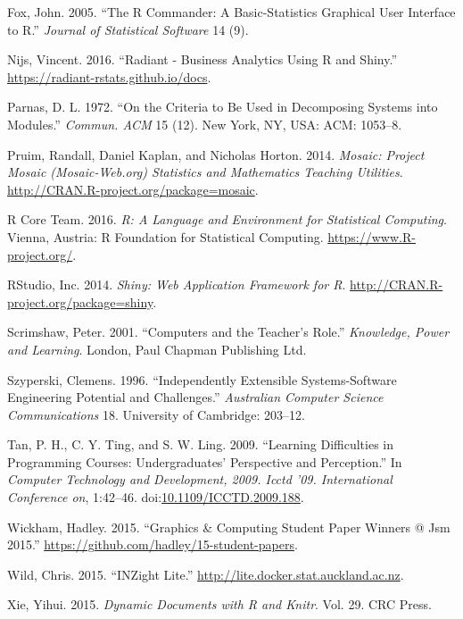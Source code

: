 \documentclass[12pt,]{article}
\begin{document}
\hypertarget{ref-fox2005}{}
Fox, John. 2005. ``The R Commander: A Basic-Statistics Graphical User
Interface to R.'' \emph{Journal of Statistical Software} 14 (9).

\hypertarget{ref-radiant}{}
Nijs, Vincent. 2016. ``Radiant - Business Analytics Using R and Shiny.''
\url{https://radiant-rstats.github.io/docs}.

\hypertarget{ref-parnas1972criteria}{}
Parnas, D. L. 1972. ``On the Criteria to Be Used in Decomposing Systems
into Modules.'' \emph{Commun. ACM} 15 (12). New York, NY, USA: ACM:
1053--8.

\hypertarget{ref-mosaic}{}
Pruim, Randall, Daniel Kaplan, and Nicholas Horton. 2014. \emph{Mosaic:
Project Mosaic (Mosaic-Web.org) Statistics and Mathematics Teaching
Utilities}. \url{http://CRAN.R-project.org/package=mosaic}.

\hypertarget{ref-r-stat}{}
R Core Team. 2016. \emph{R: A Language and Environment for Statistical
Computing}. Vienna, Austria: R Foundation for Statistical Computing.
\url{https://www.R-project.org/}.

\hypertarget{ref-shiny}{}
RStudio, Inc. 2014. \emph{Shiny: Web Application Framework for R}.
\url{http://CRAN.R-project.org/package=shiny}.

\hypertarget{ref-scrimshaw2001computers}{}
Scrimshaw, Peter. 2001. ``Computers and the Teacher's Role.''
\emph{Knowledge, Power and Learning}. London, Paul Chapman Publishing
Ltd.

\hypertarget{ref-szyperski1996independently}{}
Szyperski, Clemens. 1996. ``Independently Extensible Systems-Software
Engineering Potential and Challenges.'' \emph{Australian Computer
Science Communications} 18. University of Cambridge: 203--12.

\hypertarget{ref-5359977}{}
Tan, P. H., C. Y. Ting, and S. W. Ling. 2009. ``Learning Difficulties in
Programming Courses: Undergraduates' Perspective and Perception.'' In
\emph{Computer Technology and Development, 2009. Icctd '09.
International Conference on}, 1:42--46.
doi:\href{https://doi.org/10.1109/ICCTD.2009.188}{10.1109/ICCTD.2009.188}.

\hypertarget{ref-interpolate}{}
Wickham, Hadley. 2015. ``Graphics \& Computing Student Paper Winners @
Jsm 2015.'' \url{https://github.com/hadley/15-student-papers}.

\hypertarget{ref-inzight}{}
Wild, Chris. 2015. ``INZight Lite.''
\url{http://lite.docker.stat.auckland.ac.nz}.

\hypertarget{ref-xie2015}{}
Xie, Yihui. 2015. \emph{Dynamic Documents with R and Knitr}. Vol. 29.
CRC Press.
\end{document}
